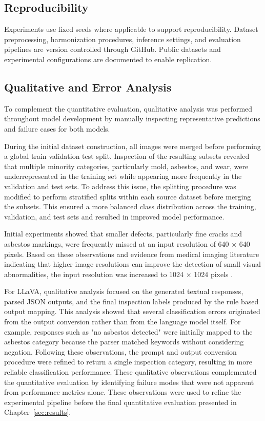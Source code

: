 \subsection{Reproducibility}

Experiments use fixed seeds where applicable to support reproducibility. Dataset preprocessing, harmonization procedures, inference settings, and evaluation pipelines are version controlled through GitHub. Public datasets and experimental configurations are documented to enable replication.

\subsection{Qualitative and Error Analysis}

To complement the quantitative evaluation, qualitative analysis was performed throughout model development by manually inspecting representative predictions and failure cases for both models.

During the initial dataset construction, all images were merged before performing a global train validation test split. Inspection of the resulting subsets revealed that multiple minority categories, particularly mold, asbestos, and wear, were underrepresented in the training set while appearing more frequently in the validation and test sets. To address this issue, the splitting procedure was modified to perform stratified splits within each source dataset before merging the subsets. This ensured a more balanced class distribution across the training, validation, and test sets and resulted in improved model performance.

Initial experiments showed that smaller defects, particularly fine cracks and asbestos markings, were frequently missed at an input resolution of 640 × 640 pixels. Based on these observations and evidence from medical imaging literature indicating that higher image resolutions can improve the detection of small visual abnormalities, the input resolution was increased to 1024 × 1024 pixels \cite{litjens_deep_2017,rana_yolo_2025,kamraoui_longitudinal_2022}.

For LLaVA, qualitative analysis focused on the generated textual responses, parsed JSON outputs, and the final inspection labels produced by the rule based output mapping. This analysis showed that several classification errors originated from the output conversion rather than from the language model itself. For example, responses such as "no asbestos detected" were initially mapped to the asbestos category because the parser matched keywords without considering negation. Following these observations, the prompt and output conversion procedure were refined to return a single inspection category, resulting in more reliable classification performance. These qualitative observations complemented the quantitative evaluation by identifying failure modes that were not apparent from performance metrics alone. These observations were used to refine the experimental pipeline before the final quantitative evaluation presented in Chapter~\ref{sec:results}.

